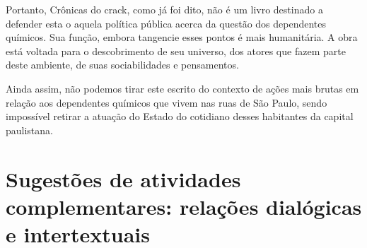 \documentclass[12pt]{extarticle}
\begin{document}
Portanto, Crônicas do crack, como já foi dito, não é um livro destinado
a defender esta o aquela política pública acerca da questão dos
dependentes químicos. Sua função, embora tangencie esses pontos é mais
humanitária. A obra está voltada para o descobrimento de seu universo,
dos atores que fazem parte deste ambiente, de suas sociabilidades e
pensamentos.

Ainda assim, não podemos tirar este escrito do contexto de ações mais
brutas em relação aos dependentes químicos que vivem nas ruas de São
Paulo, sendo impossível retirar a atuação do Estado do cotidiano desses
habitantes da capital paulistana.


\section{Sugestões de atividades complementares: relações dialógicas e
intertextuais}






\end{document}

